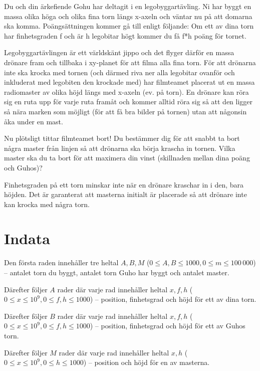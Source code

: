 

Du och din ärkefiende Gohu har deltagit i en legobyggartävling.
Ni har byggt en massa olika höga och olika fina torn längs x-axeln och väntar nu på att domarna ska komma.
Poängsättningen kommer gå till enligt följande: Om ett av dina torn har finhetsgraden f och är h legobitar högt kommer du få f*h poäng för tornet.

Legobyggartävlingen är ett världskänt jippo och det flyger därför en massa drönare fram och tillbaka i xy-planet för att filma alla fina torn.
För att drönarna inte ska krocka med tornen (och därmed riva ner alla legobitar ovanför och inkluderat med legobiten den krockade med) har filmteamet placerat ut en massa radiomaster av olika höjd längs med x-axeln (ev. på torn).
En drönare kan röra sig en ruta upp för varje ruta framåt och kommer alltid röra sig så att den ligger så nära marken som möjligt (för att få bra bilder på tornen) utan att någonsin åka under en mast.

Nu plötsligt tittar filmteamet bort!
Du bestämmer dig för att snabbt ta bort några master från linjen så att drönarna ska börja krascha in tornen.
Vilka master ska du ta bort för att maximera din vinst (skillnaden mellan dina poäng och Guhos)?

Finhetsgraden på ett torn minskar inte när en drönare kraschar in i den, bara höjden.
Det är garanterat att masterna initialt är placerade så att drönare inte kan krocka med några torn.


\section*{Indata}
Den första raden innehåller tre heltal $A,B,M$ ($0 \leq A,B \leq 1000, 0 \leq m \leq 100\,000$) -- antalet torn du byggt,  antalet torn Guho har byggt och antalet master.

Därefter följer $A$ rader där varje rad innehåller heltal $x,f,h$ ($0 \leq x \leq 10^9, 0\leq f,h \leq 1000$) -- position, finhetsgrad och höjd för ett av dina torn.

Därefter följer $B$ rader där varje rad innehåller heltal $x,f,h$ ($0 \leq x \leq 10^9, 0\leq f,h \leq 1000$) -- position, finhetsgrad och höjd för ett av Guhos torn.

Därefter följer $M$ rader där varje rad innehåller heltal $x,h$ ($0 \leq x \leq 10^9, 0\leq h \leq 1000$) -- position och höjd för en av masterna.

